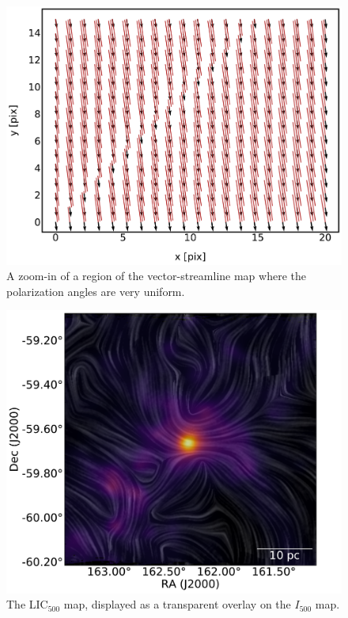 \begin{figure}[!htbp]
\centering
\includegraphics[width=\textwidth]{figures/carina/vector_sl_zoom}
\caption[A zoom-in of a uniform region of the vector-streamline map.]{A zoom-in of a region of the vector-streamline map where the polarization angles are very uniform.}
\label{fig:vector_sl_zoom}
\end{figure}

\begin{figure}[!htbp]
\centering
\includegraphics[width=\textwidth]{figures/carina/lic_han_51}
\caption[The  map, displayed as a transparent overlay on the  map.]{The LIC$_{500}$ map, displayed as a transparent overlay on the $I_{500}$ map.}
\label{fig:lic_han_51}
\end{figure}

